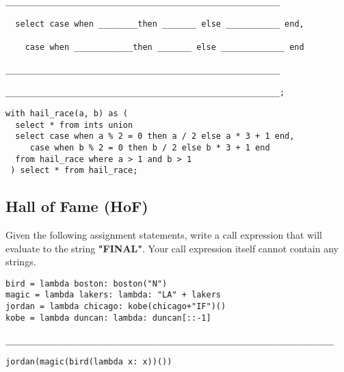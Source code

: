 \begin{questions}
\begin{lstlisting}
________________________________________________________
  
  select case when ________then _______ else ___________ end,
  
    case when ____________then _______ else _____________ end
    
________________________________________________________
    
________________________________________________________;

\end{lstlisting}
\begin{solution}[1cm]
\begin{lstlisting}
with hail_race(a, b) as (
  select * from ints union
  select case when a % 2 = 0 then a / 2 else a * 3 + 1 end, 
     case when b % 2 = 0 then b / 2 else b * 3 + 1 end 
  from hail_race where a > 1 and b > 1
 ) select * from hail_race;
\end{lstlisting}
\end{solution}

\end{questions}


\subsection*{Hall of Fame (HoF)}
\begin{questions}
\question Given the following assignment statements, write a call expression that will evaluate to the string \textbf{"FINAL"}. Your call expression itself cannot contain any strings. 
\begin{lstlisting}
bird = lambda boston: boston("N")
magic = lambda lakers: lambda: "LA" + lakers
jordan = lambda chicago: kobe(chicago+"IF")()
kobe = lambda duncan: lambda: duncan[::-1]

___________________________________________________________________
\end{lstlisting}
\begin{solution}
\begin{lstlisting}
jordan(magic(bird(lambda x: x))())
\end{lstlisting}
\end{solution}

\end{questions}

